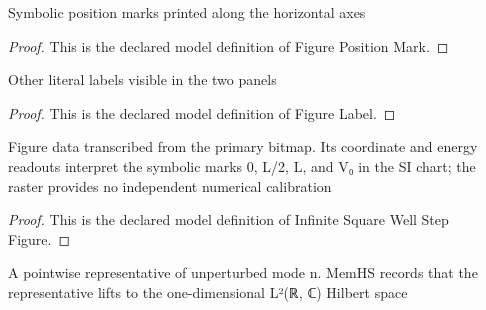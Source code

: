 \begin{definition}
  \label{def:physics:phyx-mini-0545:phyxminiproblems-problemphyxmini0545-figurepositionmark}
  Symbolic position marks printed along the horizontal axes
\end{definition}
\begin{proof}
  This is the declared model definition of Figure Position Mark.
\end{proof}
\begin{definition}
  \label{def:physics:phyx-mini-0545:phyxminiproblems-problemphyxmini0545-figurelabel}
  Other literal labels visible in the two panels
\end{definition}
\begin{proof}
  This is the declared model definition of Figure Label.
\end{proof}
\begin{definition}
  \label{def:physics:phyx-mini-0545:phyxminiproblems-problemphyxmini0545-infinitesquarewellstepfigure}
  Figure data transcribed from the primary bitmap. Its coordinate and energy readouts interpret the symbolic marks 0, L/2, L, and V₀ in the SI chart; the raster provides no independent numerical calibration
\end{definition}
\begin{proof}
  This is the declared model definition of Infinite Square Well Step Figure.
\end{proof}
\begin{definition}
  \label{def:physics:phyx-mini-0545:phyxminiproblems-problemphyxmini0545-infinitesquarewelleigenstate}
  A pointwise representative of unperturbed mode n. MemHS records that the representative lifts to the one-dimensional L²(ℝ, ℂ) Hilbert space
\end{definition}
